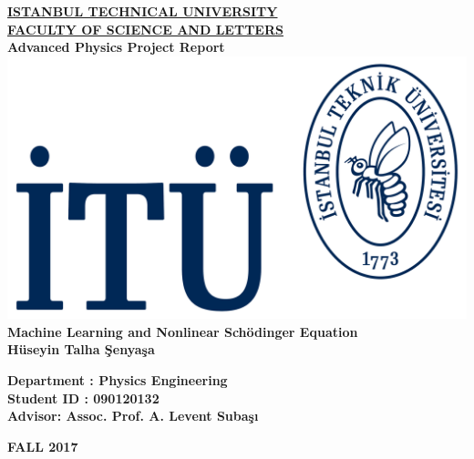 \documentclass[a4paper,times,12pt]{article}
\begin{document}
\begin{titlepage}
\begin{center}
\vspace*{1cm}
\underline{\textbf{\Large ISTANBUL TECHNICAL UNIVERSITY}} \\[10 pt]

\underline{\textbf{\large FACULTY OF SCIENCE AND LETTERS}} \\[15 pt]

\textbf{\large Advanced Physics Project Report} \\
\vspace{1.8 cm}
\includegraphics[scale=0.2]{itu_logo.pdf} \\
\vspace{1.8 cm}
\textbf{\large Machine Learning and Nonlinear Sch{\"o}dinger Equation} \\[5 pt]
\textbf{H{\"u}seyin Talha \c{S}enya\c{s}a}\\
\vspace{1.5 cm}
\end{center}
\vfill
\noindent\textbf{{Department : Physics Engineering}}\\
    \textbf{Student ID \hspace{0.2 cm}: 090120132}\\
    \textbf{Advisor\hspace{1.1 cm}: Assoc. Prof. A. Levent Suba\c{s}{\i}}
\vspace{2 cm}

\center\textbf{FALL 2017}

\end{titlepage}






\setcounter{page}{1}
\end{document}
